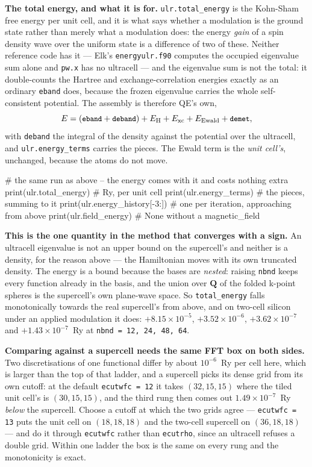 \documentclass[11pt,a4paper]{article}
\newcommand{\code}[1]{\texttt{\small #1}}
\begin{document}
\textbf{The total energy, and what it is for.} \code{ulr.total\_energy} is the
Kohn-Sham free energy per unit cell, and it is what says whether a modulation is
the ground state rather than merely what a modulation does: the energy
\emph{gain} of a spin density wave over the uniform state is a difference of two
of these. Neither reference code has it --- Elk's \code{energyulr.f90} computes
the occupied eigenvalue sum alone and \code{pw.x} has no ultracell --- and the
eigenvalue sum is not the total: it double-counts the Hartree and
exchange-correlation energies exactly as an ordinary \code{eband} does, because
the frozen eigenvalue carries the whole self-consistent potential. The
assembly is therefore QE's own,
\[
  E = (\code{eband} + \code{deband}) + E_{\mathrm H} + E_{\mathrm{xc}}
      + E_{\mathrm{Ewald}} + \code{demet},
\]
with \code{deband} the integral of the density against the potential over the
ultracell, and \code{ulr.energy\_terms} carries the pieces. The Ewald term is the
\emph{unit cell's}, unchanged, because the atoms do not move.

\begin{pycode}
# the same run as above -- the energy comes with it and costs nothing extra
print(ulr.total_energy)                # Ry, per unit cell
print(ulr.energy_terms)                # the pieces, summing to it
print(ulr.energy_history[-3:])         # one per iteration, approaching from above
print(ulr.field_energy)                # None without a magnetic_field
\end{pycode}

\textbf{This is the one quantity in the method that converges with a sign.} An
ultracell eigenvalue is not an upper bound on the supercell's and neither is a
density, for the reason above --- the Hamiltonian moves with its own truncated
density. The energy is a bound because the bases are \emph{nested}: raising
\code{nbnd} keeps every function already in the basis, and the union over
$\mathbf Q$ of the folded k-point spheres is the supercell's own plane-wave
space. So \code{total\_energy} falls monotonically towards the real supercell's
from above, and on two-cell silicon under an applied modulation it does:
$+8.15\times10^{-5}$, $+3.52\times10^{-6}$, $+3.62\times10^{-7}$ and
$+1.43\times10^{-7}$~Ry at \code{nbnd = 12, 24, 48, 64}.

\textbf{Comparing against a supercell needs the same FFT box on both sides.}
Two discretisations of one functional differ by about $10^{-6}$~Ry per cell
here, which is larger than the top of that ladder, and a supercell picks its
dense grid from its own cutoff: at the default \code{ecutwfc = 12} it takes
$(32,15,15)$ where the tiled unit cell's is $(30,15,15)$, and the third rung
then comes out $1.49\times10^{-7}$~Ry \emph{below} the supercell. Choose a
cutoff at which the two grids agree --- \code{ecutwfc = 13} puts the unit cell on
$(18,18,18)$ and the two-cell supercell on $(36,18,18)$ --- and do it through
\code{ecutwfc} rather than \code{ecutrho}, since an ultracell refuses a double
grid. Within one ladder the box is the same on every rung and the monotonicity
is exact.
\end{document}
